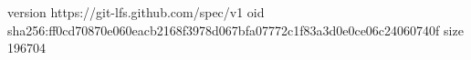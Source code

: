 version https://git-lfs.github.com/spec/v1
oid sha256:ff0cd70870e060eacb2168f3978d067bfa07772c1f83a3d0e0ce06c24060740f
size 196704
